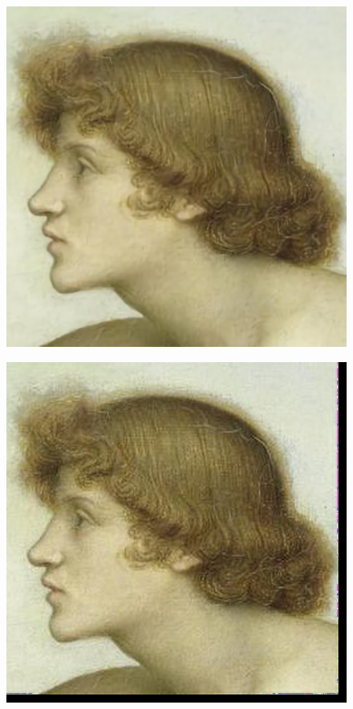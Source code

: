 \documentclass{article}
\theoremstyle{definition}
\begin{document}
\begin{figure}[h]
\centering
\begin{minipage}{.5\textwidth}
  \centering
  \includegraphics[width=.8\linewidth]{Imagenes/Phosphorus_and_Hesperus_Waifu2x.png}
  \label{fig:test1}
\end{minipage}%
\begin{minipage}{.5\textwidth}
  \centering
  \includegraphics[width=.8\linewidth]{Imagenes/Phosphorus_and_Hesperus_UNet.png}
  \label{fig:test2}
\end{minipage}
\end{figure}
\end{document}
